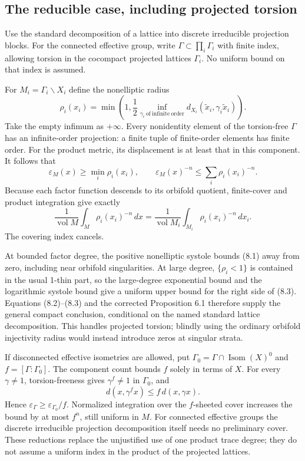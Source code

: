 \documentclass[10pt]{article}
\begin{document}
\subsection*{The reducible case, including projected torsion}
Use the standard decomposition of a lattice into discrete irreducible projection blocks. For the connected effective group, write \(\Gamma\subset\prod_i\Gamma_i\) with finite index, allowing torsion in the cocompact projected lattices \(\Gamma_i\). No uniform bound on that index is assumed.\par
For \(M_i=\Gamma_i\backslash X_i\) define the nonelliptic radius \[\rho_i(x_i)=
 \min\!\left(1,\frac12
 \inf_{\gamma_i\ \mathrm{of\ infinite\ order}}
 d_{X_i}(\widetilde x_i,\gamma_i\widetilde x_i)\right).
 \tag{8.1}\] Take the empty infimum as \(+\infty\). Every nonidentity element of the torsion-free \(\Gamma\) has an infinite-order projection: a finite tuple of finite-order elements has finite order. For the product metric, its displacement is at least that in this component. It follows that \[\varepsilon_M(x)\ge\min_i\rho_i(x_i),
 \qquad
 \varepsilon_M(x)^{-n}\le\sum_i\rho_i(x_i)^{-n}.
 \tag{8.2}\] Because each factor function descends to its orbifold quotient, finite-cover and product integration give exactly \[\frac1{\operatorname{vol}M}\int_M\rho_i(x_i)^{-n}\,dx
 =
 \frac1{\operatorname{vol}M_i}\int_{M_i}\rho_i(x_i)^{-n}\,dx_i.
 \tag{8.3}\] The covering index cancels.\par
At bounded factor degree, the positive nonelliptic systole bounds (8.1) away from zero, including near orbifold singularities. At large degree, \(\{\rho_i<1\}\) is contained in the usual 1-thin part, so the large-degree exponential bound and the logarithmic systole bound give a uniform upper bound for the right side of (8.3). Equations (8.2)–(8.3) and the corrected Proposition 6.1 therefore supply the general compact conclusion, conditional on the named standard lattice decomposition. This handles projected torsion; blindly using the ordinary orbifold injectivity radius would instead introduce zeros at singular strata.\par
If disconnected effective isometries are allowed, put \(\Gamma_0=\Gamma\cap\operatorname{Isom}(X)^0\) and \(f=[\Gamma:\Gamma_0]\). The component count bounds \(f\) solely in terms of \(X\). For every \(\gamma\ne1\), torsion-freeness gives \(\gamma^f\ne1\) in \(\Gamma_0\), and \[d(x,\gamma^f x)\le f\,d(x,\gamma x).\] Hence \(\varepsilon_\Gamma\ge\varepsilon_{\Gamma_0}/f\). Normalized integration over the \(f\)-sheeted cover increases the bound by at most \(f^n\), still uniform in \(M\). For connected effective groups the discrete irreducible projection decomposition itself needs no preliminary cover. These reductions replace the unjustified use of one product trace degree; they do not assume a uniform index in the product of the projected lattices.\par
\end{document}
